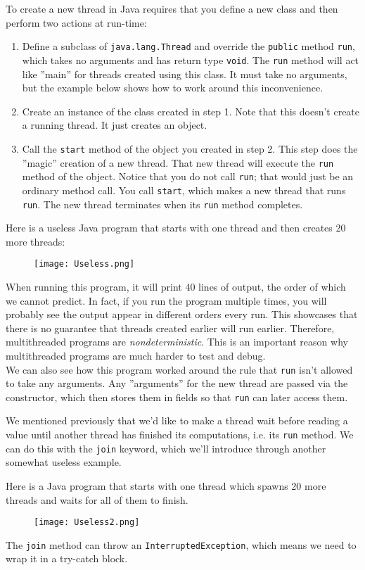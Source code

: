 \documentclass[main]{subfiles}
\begin{document}
To create a new thread in Java requires that you define a new class and then perform two actions at run-time:
\begin{enumerate}
    \item Define a subclass of \texttt{java.lang.Thread} and override the \texttt{public} method \texttt{run}, which takes no arguments and has return type \texttt{void}. The \texttt{run} method will act like ''main'' for threads created using this class. It must take no arguments, but the example below shows how to work around this inconvenience.
    \item Create an instance of the class created in step 1. Note that this doesn't create a running thread. It just creates an object.
    \item Call the \texttt{start} method of the object you created in step 2. This step does the ''magic'' creation of a new thread. That new thread will execute the \texttt{run} method of the object. Notice that you do not call \texttt{run}; that would just be an ordinary method call. You call \texttt{start}, which makes a new thread that runs \texttt{run}. The new thread terminates when its \texttt{run} method completes.
\end{enumerate}
\begin{example}
    Here is a useless Java program that starts with one thread and then creates 20 more threads:
    \begin{figure}[H]
        \centering
        \texttt{[image: Useless.png]}
    \end{figure}
    When running this program, it will print 40 lines of output, the order of which we cannot predict. In fact, if you run the program multiple times, you will probably see the output appear in different orders every run. This showcases that there is no guarantee that threads created earlier will run earlier. Therefore, multithreaded programs are \textit{nondeterministic}. This is an important reason why multithreaded programs are much harder to test and debug.\\[3mm]
    We can also see how this program worked around the rule that \texttt{run} isn't allowed to take any arguments. Any ''arguments'' for the new thread are passed via the constructor, which then stores them in fields so that \texttt{run} can later access them.
\end{example}
We mentioned previously that we'd like to make a thread wait before reading a value until another thread has finished its computations, i.e. its \texttt{run} method. We can do this with the \texttt{join} keyword, which we'll introduce through another somewhat useless example.
\begin{example}
    Here is a Java program that starts with one thread which spawns 20 more threads and waits for all of them to finish.
    \begin{figure}[H]
        \centering
        \texttt{[image: Useless2.png]}
    \end{figure}
    The \texttt{join} method can throw an \texttt{InterruptedException}, which means we need to wrap it in a try-catch block.
\end{example}
\end{document}
